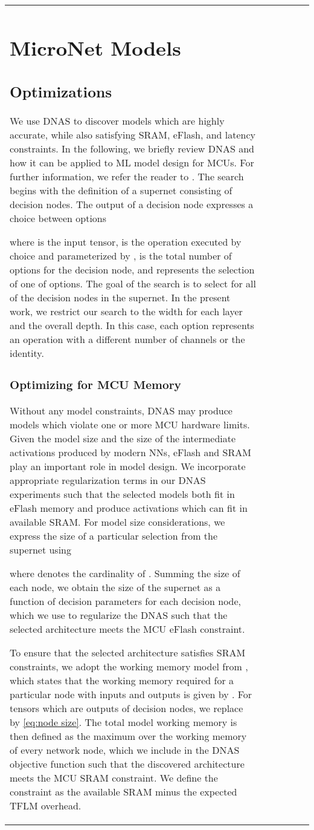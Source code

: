 \documentclass{article}
\begin{document}
\begin{table}[t]
\begin{tabular}{l| c | c | c | c | c}
\section{MicroNet Models}
\label{MicroNet Models}

\subsection{Optimizations}
We use DNAS to discover models which are highly accurate, while also satisfying SRAM, eFlash, and latency constraints. In the following, we briefly review DNAS and how it can be applied to ML model design for MCUs. For further information, we refer the reader to \cite{liu2018darts,cai2018proxylessnas,dong2019network,Wan_2020_CVPR}. The search begins with the definition of a supernet consisting of decision nodes. The output of a decision node expresses a choice between  options

where  is the input tensor,  is the operation executed by choice  and parameterized by ,  is the total number of options for the decision node, and  represents the selection of one of  options. The goal of the search is to select  for all of the decision nodes in the supernet. In the present work, we restrict our search to the width for each layer and the overall depth. In this case, each option  represents an operation with a different number of channels \cite{Wan_2020_CVPR} or the identity.

\subsubsection{Optimizing for MCU Memory}
Without any model constraints, DNAS may produce models which violate one or more MCU hardware limits. Given the model size and the size of the intermediate activations produced by modern NNs, eFlash and SRAM play an important role in model design. We incorporate appropriate regularization terms in our DNAS experiments such that the selected models both fit in eFlash memory and produce activations which can fit in available SRAM. For model size considerations, we express the size of a particular selection from the supernet using

where  denotes the cardinality of . Summing the size of each node, we obtain the size of the supernet as a function of decision parameters  for each decision node, which we use to regularize the DNAS such that the selected architecture meets the MCU eFlash constraint. 

To ensure that the selected architecture satisfies SRAM constraints, we adopt the working memory model from \citet{fedorov2019sparse}, which states that the working memory required for a particular node with inputs  and outputs  is given by . For tensors which are outputs of decision nodes, we replace  by \eqref{eq:node size}. The total model working memory is then defined as the maximum over the working memory of every network node, which we include in the DNAS objective function such that the discovered architecture meets the MCU SRAM constraint. We define the constraint as the available SRAM minus the expected TFLM overhead.


\end{tabular}
\end{table}
\end{document}
